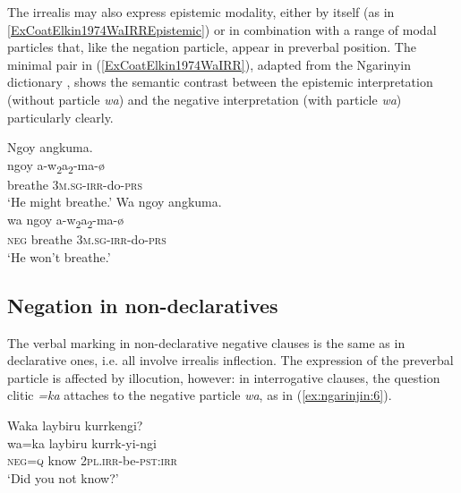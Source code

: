 \documentclass[output=paper,colorlinks,citecolor=brown]{langscibook}
\begin{document}
The irrealis may also express epistemic modality, either by itself (as in \ref{ExCoatElkin1974WaIRREpistemic}) or in combination with a range of modal particles that, like the negation particle, appear in preverbal position. The minimal pair in (\ref{ExCoatElkin1974WaIRR}), adapted from the Ngarinyin dictionary \citet{CoatElkin1974}, shows the semantic contrast between the epistemic interpretation (without particle \textit{wa}) and the negative interpretation (with particle \textit{wa}) particularly clearly.

\begin{exe}
\ex \label{ExCoatElkin1974WaIRR}
\begin{xlist}
\ex \label{ExCoatElkin1974WaIRREpistemic}
\glll Ngoy angkuma.\\
ngoy a-w\textsubscript{2}a\textsubscript{2}-ma-{\o}\\
breathe 3\textsc{m.sg}-\textsc{irr}-do-\textsc{prs}\\
\trans `He might breathe.'
\ex \label{ExCoatElkin1974WaIRRNegation}
\glll Wa ngoy angkuma.\\
wa ngoy a-w\textsubscript{2}a\textsubscript{2}-ma-{\o}\\
\textsc{neg} breathe 3\textsc{m.sg}-\textsc{irr}-do-\textsc{prs}\\
\trans `He won't breathe.' \citep[427, entry: \textit{ŋoj}]{CoatElkin1974}
\end{xlist}
\end{exe}

\subsection{Negation in non-declaratives}

The verbal marking in non-declarative negative clauses is the same as in declarative ones, i.e. all involve irrealis inflection. The expression of the preverbal particle is affected by illocution, however: in interrogative clauses, the question clitic \textit{=ka} attaches to the negative particle \textit{wa}, as in (\ref{ex:ngarinjin:6}).

\begin{exe}
\ex \label{ex:ngarinjin:6}
\glll Waka laybiru kurrkengi?\\
wa=ka laybiru kurrk-yi-ngi\\
\textsc{neg}=\textsc{q} know 2\textsc{pl}.\textsc{irr}-be-\textsc{pst:irr} \\
\trans `Did you not know?' \citep[470, entry: \textit{waga}]{CoatElkin1974}
\end{exe}
\end{document}
